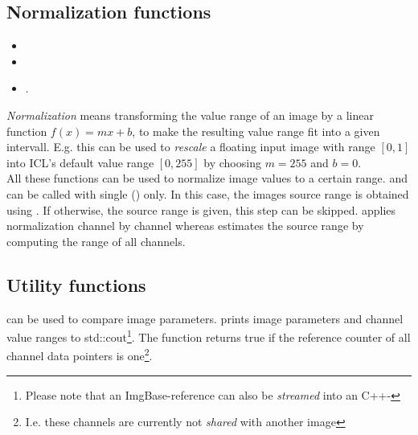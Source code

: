 \subsection{Normalization functions}
\begin{itemize}
\item {}
\item {}
\item {}.
\end{itemize} 
\emph{Normalization} means transforming the value range of an image by a linear function $f(x)=mx+b$, to make the resulting value range fit into a given intervall. E.g. this can be used to \emph{rescale} a floating input image with range $[0,1]$ into ICL's default value range $[0,255]$ by choosing $m=255$ and $b=0$. \\
All these functions can be used to normalize image values to a certain range.  and  can be called with single  () only. In this case, the images source range is obtained using . If otherwise, the source range is given, this step can be skipped.  applies normalization channel by channel whereas  estimates the source range by computing the range of all channels.

\subsection{Utility functions}
 can be used to compare image parameters.  prints image parameters and channel value ranges to std::cout\footnote{Please note that an ImgBase-reference can also be \emph{streamed} into an C++-}. The  function returns true if the reference counter of all channel data pointers is one\footnote{I.e. these channels are currently not \emph{shared} with another image}.
